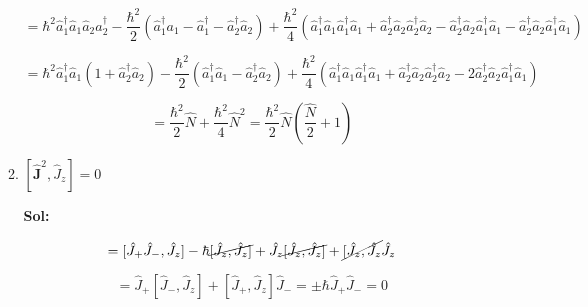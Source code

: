 \documentclass[12pt,a4paper]{article}
\begin{document}
\begin{enumerate}
\begin{enumerate}
    \begin{equation*}
        = \hbar^2 \hat{a}_{1}^{\dagger}\hat{a}_{1} \hat{a}_{2} \hat{a}_{2}^{\dagger} - \frac{\hbar^2}{2} (\hat{a}_{1}^{\dagger} a_{1} - \hat{a}_{1}^{\dagger} - \hat{a}_{2}^{\dagger} \hat{a}_{2}) + \frac{\hbar^2}{4} (\hat{a}_{1}^{\dagger}\hat{a}_{1}\hat{a}_{1}^{\dagger} \hat{a}_{1} + \hat{a}_{2}^{\dagger}\hat{a}_{2}\hat{a}_{2}^{\dagger} \hat{a}_{2} - \hat{a}_{2}^{\dagger}\hat{a}_{2}\hat{a}_{1}^{\dagger} \hat{a}_{1} - \hat{a}_{2}^{\dagger}\hat{a}_{2}\hat{a}_{1}^{\dagger} \hat{a}_{1} )
    \end{equation*}
    
    \begin{equation*}
        = \hbar^2 \hat{a}_{1}^{\dagger} \hat{a}_{1} (1 + \hat{a}_{2}^{\dagger} \hat{a}_{2}) - \frac{\hbar^2}{2}(\hat{a}_{1}^{\dagger}\hat{a}_{1} - \hat{a}_{2}^{\dagger}\hat{a}_{2}) + \frac{\hbar^2}{4} (\hat{a}_{1}^{\dagger}\hat{a}_{1}\hat{a}_{1}^{\dagger} \hat{a}_{1} + \hat{a}_{2}^{\dagger}\hat{a}_{2}\hat{a}_{2}^{\dagger} \hat{a}_{2} - 2 \hat{a}_{2}^{\dagger}\hat{a}_{2}\hat{a}_{1}^{\dagger} \hat{a}_{1} )
    \end{equation*}
    
    \begin{equation*}
        = \frac{\hbar^2}{2}\hat{N} + \frac{\hbar^2}{4}\hat{N}^2 = \frac{\hbar^2}{2}\hat{N}\left(\frac{\hat{N}}{2} + 1\right)
    \end{equation*}
    
    
    
    
    \item $[\mathbf{\hat{J}}^2 , \hat{J}_{z}] = 0$
    
    \textbf{Sol:}
    
    \begin{equation*}
        [\mathbf{\hat{J}}^2 , \hat{J}_{z}] = [\hat{J}_{+}\hat{J}_{-}, \hat{J}_{z}] - \hbar \cancel{[\hat{J}_{z}, \hat{J}_{z}]} + \hat{J}_{z}\cancel{[\hat{J}_{z}, \hat{J_{z}}]} + \cancel{[\hat{J}_{z}, \hat{J}_{z}} \hat{J}_{z} 
    \end{equation*}
    
    \begin{equation*}
        = \hat{J}_{+}[\hat{J}_{-}, \hat{J}_{z}] + [\hat{J}_{+}, \hat{J}_{z}] \hat{J}_{-} = \pm \hbar \hat{J}_{+} \hat{J}_{-} = 0
    \end{equation*}
    
    
    
\end{enumerate}




\end{enumerate}
\end{document}
